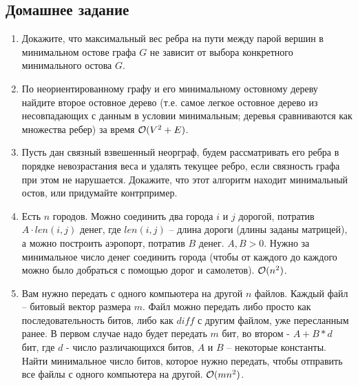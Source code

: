 \subsection{Домашнее задание}
\begin{enumerate}
  \item
    Докажите, что максимальный вес ребра на пути между парой вершин в минимальном остове графа $G$
    не зависит от выбора конкретного минимального остова $G$.
    
  \item 
    По неориентированному графу и его минимальному остовному дереву найдите второе остовное
    дерево (т.е. самое легкое остовное дерево из несовпадающих с данным в условии минимальным;
    деревья сравниваются как множества ребер) за время $\mathcal{O}(V^2 + E)$.

  \item
    Пусть дан связный взвешенный неорграф, будем рассматривать его ребра в порядке невозрастания веса и
    удалять текущее ребро, если связность графа при этом не нарушается. Докажите, что этот алгоритм
    находит минимальный остов, или придумайте контрпример.
    
  \item
     Есть $n$ городов. Можно соединить два города $i$ и $j$ дорогой, потратив $A \cdot len(i, j)$
     денег, где $len(i, j)$ -- длина дороги (длины заданы матрицей), а можно построить аэропорт,
     потратив $B$ денег. $A, B > 0$. Нужно за минимальное число денег соединить города
     (чтобы от каждого до каждого можно было добраться с помощью дорог и самолетов). $\mathcal{O}(n^2)$.

  \item
    Вам нужно передать с одного компьютера на другой $n$ файлов. Каждый файл -- битовый вектор
    размера $m$. Файл можно передать либо просто как последовательность битов, либо как $diff$
    с другим файлом, уже пересланным ранее. В первом случае надо будет передать $m$ бит, во
    втором - $A+B*d$ бит, где $d$ - число различающихся битов, $A$ и $B$ -- некоторые
    константы. Найти минимальное число битов, которое нужно передать, чтобы отправить все
    файлы с одного компьютера на другой. $\mathcal{O}(mn^2)$.

	
\end{enumerate}
